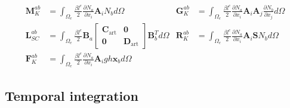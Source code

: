 \documentclass[a4paper,12pt]{article}
\newcommand{\pder}[2]{\frac{\partial#1}{\partial#2}}
\begin{document}
\begin{align}
\displaystyle\mathbf{M}_K^{ab} &= \int_{\Omega_e} \frac{\beta l^e}{2} \pder{N_a}{x_i}\mathbf{A}_i N_b d\Omega &
\displaystyle\mathbf{G}_K^{ab} &= \int_{\Omega_e} \frac{\beta l^e}{2} \pder{N_a}{x_i}\mathbf{A}_i\mathbf{A}_j \pder{N_b}{x_j} d\Omega \nonumber\\
\displaystyle\mathbf{L}_{SC}^{ab} &= \int_{\Omega_e} \frac{\beta l^e}{2} \mathbf{B}_a \left[\begin{matrix}
        \mathbf{C}_\text{art} & \mathbf{0} \\ \mathbf{0} & \mathbf{D}_\text{art}
    \end{matrix}\right] \mathbf{B}_b^T d\Omega &
\displaystyle\mathbf{R}_K^{ab} &= \int_{\Omega_e} \frac{\beta l^e}{2} \pder{N_a}{x_i}\mathbf{A}_i \mathbf{S} N_b d\Omega \\
\displaystyle\mathbf{F}_K^{ab} &= \int_{\Omega_e} \frac{\beta l^e}{2} \pder{N_a}{x_i}\mathbf{A}_i gh\mathbf{x}_b d\Omega
\nonumber
\end{align}


\subsection{Temporal integration}
\end{document}
